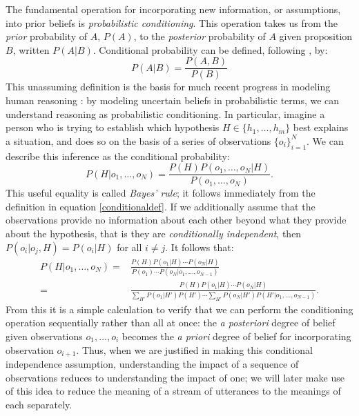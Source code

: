 \documentclass[pdfextras]{handbook}
\begin{document}
The fundamental operation for incorporating new information, or assumptions, into prior beliefs is \emph{probabilistic conditioning}. 
This operation takes us from the \emph{prior} probability of $A$, $P(A)$, to the \emph{posterior} probability of $A$ given proposition $B$, written $P(A|B)$. 
Conditional probability can be defined, following \citet{kolmogorov33}, by:
\begin{equation}
\label{conditionaldef}
P(A|B) = \frac{P(A,B)}{P(B)} 
\end{equation}
This unassuming definition is the basis for much recent progress in modeling human reasoning \cite[e.g.][]{griffithsetal08,tenenbaumetal11}: by modeling uncertain beliefs in probabilistic terms, we can understand reasoning as probabilistic conditioning. 
In particular, imagine a person who is trying to establish which hypothesis $H\in\{h_1,\dots,h_m\}$ best explains a situation, and does so on the basis of a series of observations $\{o_i\}_{i=1}^N$. 
We can describe this inference as the conditional probability:
\begin{equation}
P(H|o_1,\dots,o_N) = \frac{P(H)P(o_1,\dots,o_N|H)}{P(o_1,\dots,o_N)}.
\end{equation}
This useful equality is called \emph{Bayes' rule}; it follows immediately from the definition in equation \ref{conditionaldef}. 
If we additionally assume that the observations provide no information about each other beyond what they provide about the hypothesis, that is they are \emph{conditionally independent}, then $P(o_i|o_j, H)=P(o_i|H)$ for all $i\neq j$. 
It follows that:
\begin{eqnarray}
P(H|o_1,\dots,o_N) =& \frac{P(H)P(o_1|H)\cdots P(o_N|H)}{P(o_1)\cdots P(o_N|o_1,\dots,o_{N{-}1})} \\
=& \frac{P(H)P(o_1|H)\cdots P(o_N|H)}{\sum_{H'}P(o_1|H')P(H') \cdots \sum_{H'}P(o_N|H')P(H'|o_1,\dots,o_{N{-}1})}.
\end{eqnarray}
From this it is a simple calculation to verify that we can perform the conditioning operation sequentially rather than all at once: the \emph{a posteriori} degree of belief given observations $o_1,\dots,o_i$ becomes the \emph{a priori} degree of belief for incorporating observation $o_{i+1}$. Thus, when we are justified in making this conditional independence assumption, understanding the impact of a sequence of observations reduces to understanding the impact of one; we will later make use of this idea to reduce the meaning of a stream of utterances to the meanings of each separately.
\end{document}
